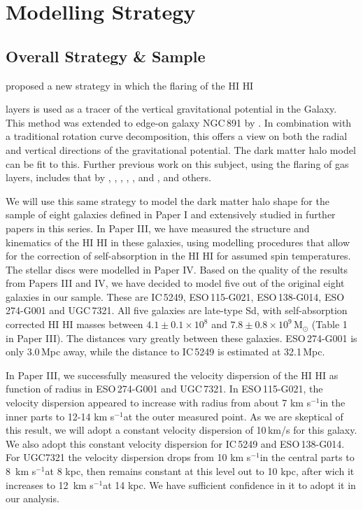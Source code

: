 \documentclass[useAMS,usenatbib]{mn2e}
\newcommand{\kms}{{km s$^{-1}$}}
\newcommand{\hi}{%
  \relax
  \ifmmode
    \textrm{\textsc{HI}}
  \else
    \textsc{H{\smaller}I}
  \fi
}
\begin{document}
\section{Modelling Strategy}\label{sec:hydrostaticmodels}
\subsection{Overall Strategy \& Sample}
\citet{Celnik1979A} proposed a new strategy in which the flaring of the \hi 
layers is used as a tracer of the vertical gravitational potential in the 
Galaxy.
This method was extended to edge-on galaxy NGC\,891 by \citet{vdk81c}.
In combination with a traditional rotation curve decomposition, this offers 
a view on both the radial and vertical directions of the gravitational 
potential.
The dark matter halo model can be fit to this.
Further previous work on this subject, using the flaring of gas layers, 
includes that by \citet{Olling1995A,Olling1996A}, \citet{Olling2000},
\citet{bc97}, \citet{nsj05}, \citet{k03}, \citet{kdkh07} and \citet{bj08},
and others.

We will use this same strategy to model the dark matter halo shape 
for the sample of eight galaxies defined in Paper I and extensively studied in
further papers in this series. 
In Paper III, we have measured the structure and kinematics of the \hi in 
these galaxies, using modelling procedures that allow for the 
correction of self-absorption in the \hi for assumed spin 
temperatures. The stellar discs were modelled in Paper IV. 
Based on the quality of the results from Papers III and IV, 
we have decided to model five out of the original eight galaxies in our sample.
These are IC\,5249, ESO\,115-G021, ESO\,138-G014, ESO\,274-G001 and UGC\,7321.
All five galaxies are late-type Sd, with self-absorption corrected \hi masses 
between $4.1\!\pm\!0.1\!\times\!10^8$ and $7.8\!\pm\!0.8\!\times10^9$\,M$_\odot$ 
(Table 1 in Paper III). The distances vary greatly between these galaxies. 
ESO\,274-G001 is only 3.0\,Mpc away, while the distance to IC\,5249 is 
estimated at 32.1\,Mpc.

In Paper III, we successfully measured the velocity dispersion of the 
\hi as function of radius in ESO\,274-G001 and UGC\,7321. 
In ESO\,115-G021, the velocity dispersion appeared to increase with radius
from about 7 \kms in the inner parts to 12-14 \kms at the outer 
measured point.
As we are skeptical of this result, we will adopt a constant velocity 
dispersion of 10\,km/s for this galaxy.
We also adopt this constant velocity dispersion for IC\,5249 and ESO\,138-G014.
For UGC7321 the velocity dispersion drops from 10 \kms in the central 
parts to 8\ \kms at 8 kpc, then remains constant at this level out to 10 kpc, 
after wich it increases to 12\ \kms at 14 kpc. We have sufficient confidence 
in it to adopt it in our analysis.
\end{document}
